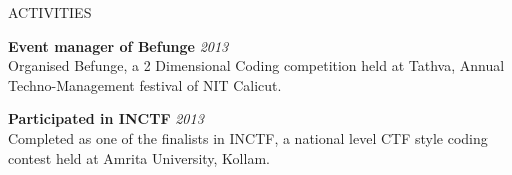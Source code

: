 \documentclass{resume} %
\begin{document}

\begin{rSection}{ACTIVITIES}

{\bf Event manager of Befunge} \hfill {\em 2013} \\ 
Organised Befunge, a 2 Dimensional Coding competition held at Tathva, Annual Techno-Management festival of NIT Calicut. 

{\bf Participated in INCTF} \hfill {\em 2013} \\ 
Completed as one of the finalists in INCTF, a national level CTF style coding contest held at Amrita University, Kollam.


\end{rSection}




\end{document}
